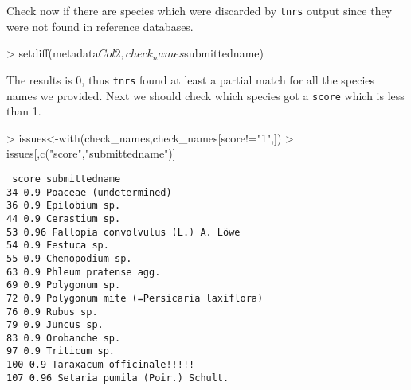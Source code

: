 \documentclass{article}
\begin{document}
\begin{Schunk}
\end{Schunk}

   Check now if there are species which were discarded by
   \texttt{tnrs} output since they were not found in reference
   databases. 
   
\begin{Schunk}
\begin{Sinput}
> setdiff(metadata$Col2,check_names$submittedname)
\end{Sinput}
\end{Schunk}

   The results is 0, thus \texttt{tnrs} found at least a partial match for all the species names we provided.
   Next we should check which species got a \texttt{score} which is less than 1.
\begin{Schunk}
\begin{Sinput}
> issues<-with(check_names,check_names[score!="1",])
> issues[,c("score","submittedname")]
\end{Sinput}
\end{Schunk}

\texttt{  
    score                          submittedname\\
34    0.9                 Poaceae (undetermined)\\
36    0.9                          Epilobium sp.\\
44    0.9                          Cerastium sp.\\
53   0.96      Fallopia convolvulus (L.) A. L\"owe\\
54    0.9                            Festuca sp.\\
55    0.9                        Chenopodium sp.\\
63    0.9                   Phleum pratense agg.\\
69    0.9                          Polygonum sp.\\
72    0.9 Polygonum mite (=Persicaria laxiflora)\\
76    0.9                              Rubus sp.\\
79    0.9                             Juncus sp.\\
83    0.9                          Orobanche sp.\\
97    0.9                           Triticum sp.\\
100   0.9              Taraxacum officinale!!!!!\\
107  0.96         Setaria pumila (Poir.) Schult.\\
}
\end{document}
